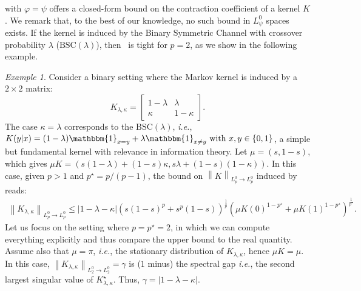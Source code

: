 \documentclass[11pt]{article}
\theoremstyle{plain}
\theoremstyle{remark}
\newtheorem{example}{Example}
\begin{document}
     
\iffalse
{} %
with $\varphi=\psi$ offers a closed-form %
bound on the contraction coefficient of a kernel $K$. %
We remark that, to the best of our knowledge, no such bound %
in $L_\psi^0$ spaces exists.
     If the kernel is induced by the Binary Symmetric Channel with crossover probability $\lambda$ ($\text{BSC}(\lambda)$),  then~ is tight for $p=2$, as we show in the following example.
     \begin{example}\label{ex:2x2}
     Consider a binary setting where the Markov kernel is induced by a $2\times 2$ matrix: 
     \begin{equation}
       K_{\lambda,\kappa} = \begin{bmatrix}
        1-\lambda & \lambda \\
        \kappa & 1-\kappa
        \end{bmatrix}.
        \label{eq:generalBinary}
    \end{equation} 
    The case $\kappa=\lambda$ corresponds to the $\text{BSC}(\lambda)$, \emph{i.e.}, $K(y|x) = (1-\lambda) \mathbbm{1}_{x=y} + \lambda\mathbbm{1}_{x\neq y} \text{ with } x,y \in \{0,1\}$, a simple but fundamental kernel with relevance in information theory. %
    Let $\mu=(s,1-s)$, which gives $\mu K = (s(1-\lambda)+(1-s)\kappa, s\lambda+(1-s)(1-\kappa)).$
   In this case, given $p>1$ and $p^\star=p/(p-1)$, the bound on $\left\lVert K \right\rVert_{L^0_p\to L^0_p}$ induced by~ reads:
    \begin{align}
       \left\lVert K_{\lambda,\kappa} \right\rVert_{L^0_p\to L^0_p} \leq |1-\lambda-\kappa|(s(1-s)^p+s^p(1-s))^\frac{1}{p}(\mu K(0)^{1-p^\star}+\mu K(1)^{1-p^\star})^\frac{1}{p^\star}.\label{eq:boundContractionBinaryGeneralp}
    \end{align}
    Let us focus on the setting where $p=p^\star=2$, in which we can compute everything explicitly and thus compare the upper bound to the real quantity. Assume also that $\mu=\pi$, \textit{i.e.}, the stationary distribution of $K_{\lambda,\kappa}$, hence $\mu K=\mu$. In this case, $\left\lVert K_{\lambda,\kappa} \right\rVert_{L_2^0\to L_2^0} = \gamma$ is ($1$ minus) the spectral gap \textit{i.e.}, the second largest singular value of $K_{\lambda,\kappa}^\star$. Thus, $\gamma=|1-\lambda-\kappa|$.
    

\end{example}
\end{document}
